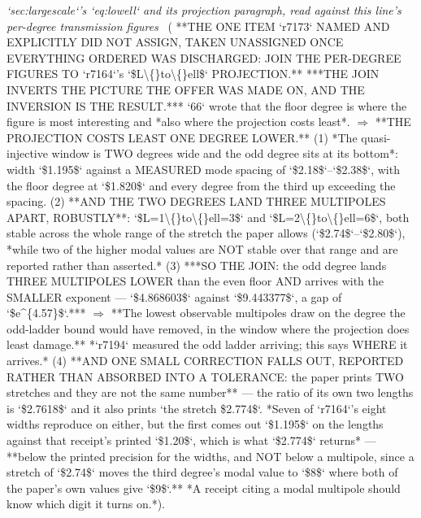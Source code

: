 \begin{description}
\textit{`sec:largescale`'s `eq:lowell` and its projection paragraph, read against this line's per-degree transmission figures} \ ( **THE ONE ITEM `r7173` NAMED AND EXPLICITLY DID NOT ASSIGN, TAKEN UNASSIGNED ONCE EVERYTHING ORDERED WAS DISCHARGED: JOIN THE PER-DEGREE FIGURES TO `r7164`'s `\$L\textbackslash\{\}to\textbackslash\{\}ell\$` PROJECTION.** ***THE JOIN INVERTS THE PICTURE THE OFFER WAS MADE ON, AND THE INVERSION IS THE RESULT.*** `66` wrote that the floor degree is where the figure is most interesting and *also where the projection costs least*. \ensuremath{\Rightarrow} **THE PROJECTION COSTS LEAST ONE DEGREE LOWER.** (1) *The quasi-injective window is TWO degrees wide and the odd degree sits at its bottom*: width `\$1.195\$` against a MEASURED mode spacing of `\$2.18\$`--`\$2.38\$`, with the floor degree at `\$1.820\$` and every degree from the third up exceeding the spacing. (2) **AND THE TWO DEGREES LAND THREE MULTIPOLES APART, ROBUSTLY**: `\$L=1\textbackslash\{\}to\textbackslash\{\}ell=3\$` and `\$L=2\textbackslash\{\}to\textbackslash\{\}ell=6\$`, both stable across the whole range of the stretch the paper allows (`\$2.74\$`--`\$2.80\$`), *while two of the higher modal values are NOT stable over that range and are reported rather than asserted.*  (3) ***SO THE JOIN: the odd degree lands THREE MULTIPOLES LOWER than the even floor AND arrives with the SMALLER exponent --- `\$4.868603\$` against `\$9.443377\$`, a gap of `\$e\textasciicircum{}\{4.57\}\$`.*** \ensuremath{\Rightarrow} **The lowest observable multipoles draw on the degree the odd-ladder bound would have removed, in the window where the projection does least damage.** *`r7194` measured the odd ladder arriving; this says WHERE it arrives.*  (4) **AND ONE SMALL CORRECTION FALLS OUT, REPORTED RATHER THAN ABSORBED INTO A TOLERANCE: the paper prints TWO stretches and they are not the same number** --- the ratio of its own two lengths is `\$2.7618\$` and it also prints `the stretch \$2.774\$`. *Seven of `r7164`'s eight widths reproduce on either, but the first comes out `\$1.195\$` on the lengths against that receipt's printed `\$1.20\$`, which is what `\$2.774\$` returns* --- **below the printed precision for the widths, and NOT below a multipole, since a stretch of `\$2.74\$` moves the third degree's modal value to `\$8\$` where both of the paper's own values give `\$9\$`.** *A receipt citing a modal multipole should know which digit it turns on.*). 

\end{description}
